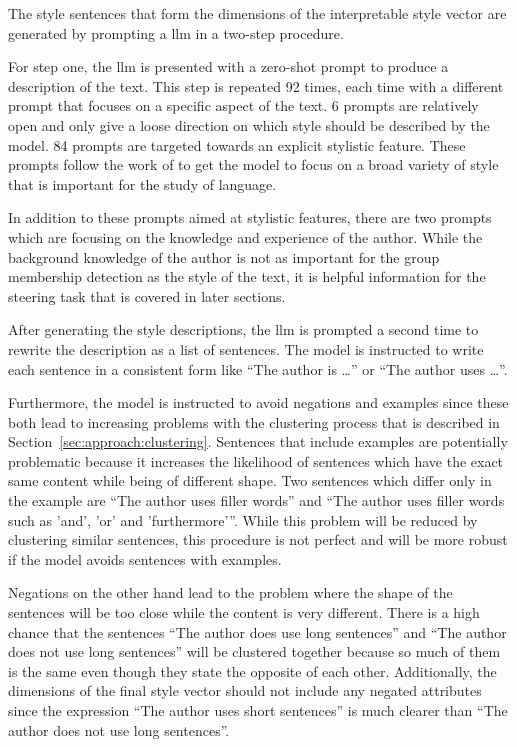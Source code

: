 The style sentences that form the dimensions of the interpretable style vector are generated by prompting a \acl{llm} in a two-step procedure.

For step one, the \ac{llm} is presented with a zero-shot prompt to produce a description of the text. This step is repeated 92 times, each time with a different prompt that focuses on a specific aspect of the text. 6 prompts are relatively open and only give a loose direction on which style should be described by the model. 84 prompts are targeted towards an explicit stylistic feature. These prompts follow the work of \citet{patelLearningInterpretableStyle2023,tausczikPsychologicalMeaningWords2010} to get the model to focus on a broad variety of style that is important for the study of language.

In addition to these prompts aimed at stylistic features, there are two prompts which are focusing on the knowledge and experience of the author. While the background knowledge of the author is not as important for the group membership detection as the style of the text, it is helpful information for the steering task that is covered in later sections.

After generating the style descriptions, the \ac{llm} is prompted a second time to rewrite the description as a list of sentences. The model is instructed to write each sentence in a consistent form like \enquote{The author is \ldots} or \enquote{The author uses \ldots}.

Furthermore, the model is instructed to avoid negations and examples since these both lead to increasing problems with the clustering process that is described in Section~\ref{sec:approach:clustering}.
Sentences that include examples are potentially problematic because it increases the likelihood of sentences which have the exact same content while being of different shape. %
Two sentences which differ only in the example are \enquote{The author uses filler words} and \enquote{The author uses filler words such as 'and', 'or' and 'furthermore'}. While this problem will be reduced by clustering similar sentences, this procedure is not perfect and will be more robust if the model avoids sentences with examples.

Negations on the other hand lead to the problem where the shape of the sentences will be too close while the content is very different. There is a high chance that the sentences \enquote{The author does use long sentences} and \enquote{The author does not use long sentences} will be clustered together because so much of them is the same even though they state the opposite of each other.
Additionally, the dimensions of the final style vector should not include any negated attributes since the expression \enquote{The author uses short sentences} is much clearer than \enquote{The author does not use long sentences}.

